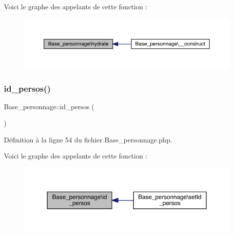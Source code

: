 Voici le graphe des appelants de cette fonction \+:\nopagebreak
\begin{figure}[H]
\begin{center}
\leavevmode
\includegraphics[width=350pt]{class_base__personnage_a100783dd2f191636d3eab860a60c18f6_icgraph}
\end{center}
\end{figure}
\mbox{\label{class_base__personnage_ab840c279a1234075b5598b6bc48c0288}} 
\subsubsection{\texorpdfstring{id\+\_\+persos()}{id\_persos()}}
{\footnotesize\ttfamily Base\+\_\+personnage\+::id\+\_\+persos (\begin{DoxyParamCaption}{ }\end{DoxyParamCaption})}



Définition à la ligne 54 du fichier Base\+\_\+personnage.\+php.

Voici le graphe des appelants de cette fonction \+:\nopagebreak
\begin{figure}[H]
\begin{center}
\leavevmode
\includegraphics[width=345pt]{class_base__personnage_ab840c279a1234075b5598b6bc48c0288_icgraph}
\end{center}
\end{figure}
\mbox{\label{class_base__personnage_abd3b2c38016dc7f95b967225d4dfbd17}} 
